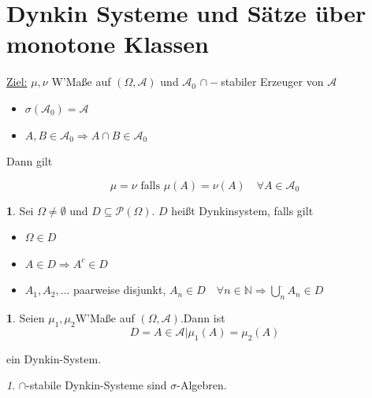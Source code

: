 \documentclass[10pt,a4paper]{report}
\numberwithin{equation}{section}
\numberwithin{figure}{section}
\theoremstyle{plain}
\theoremstyle{definition}
\newtheorem{defn}[thm]{\protect\definitionname}
\newtheorem{example}[thm]{\protect\examplename}
\theoremstyle{remark}
\newtheorem{rem}[thm]{\protect\remarkname}
\theoremstyle{plain}
\providecommand{\definitionname}{Definition}
\providecommand{\examplename}{Beispiel}
\providecommand{\remarkname}{Bemerkung}
\newcommand{\1}{ \mathbb{1} } %
\begin{document}
\section{Dynkin Systeme und Sätze über monotone Klassen} %
\uline{Ziel:} $\mu,\nu$ W'Maße auf $(\Omega,\mathcal{A})$ und
$\mathcal{A}_{0}$ $\cap-$stabiler Erzeuger von $\mathcal{A}$
\begin{itemize}
\item $\sigma(\mathcal{A}_{0})=\mathcal{A}$
\item $A,B\in\mathcal{A}_{0}\Rightarrow A\cap B\in\mathcal{A}_{0}$
\end{itemize}
Dann gilt

\[
\mu=\nu\text{ falls }\mu(A)=\nu(A)\quad\forall A\in\mathcal{A}_{0}
\]

\begin{defn}  %
  Sei $\Omega\neq\emptyset$ und $D\subseteq\mathcal{P}(\Omega)$. $D$
  heißt Dynkinsystem, falls gilt
  \begin{itemize}
  \item $\Omega\in D$
  \item $A\in D\Rightarrow A^{c}\in D$
  \item $A_{1},A_{2},\ldots$ paarweise disjunkt, $A_{n}\in
    D\quad\forall n\in\mathbb{N}\Rightarrow{\displaystyle
      \bigcup_{n}^{\cdot}A_{n}\in D}$
  \end{itemize}
\end{defn}
\begin{example}
  Seien $\mu_{1},\mu_{2}$W'Maße auf $(\Omega,\mathcal{A}).$Dann ist
  \[
  D={A\in\mathcal{A}|\mu_{1}(A)=\mu_{2}(A)}
  \]


  ein Dynkin-System.
\end{example}
\begin{rem}
  $\cap$-stabile Dynkin-Systeme sind $\sigma$-Algebren.
\end{rem}
\end{document}
